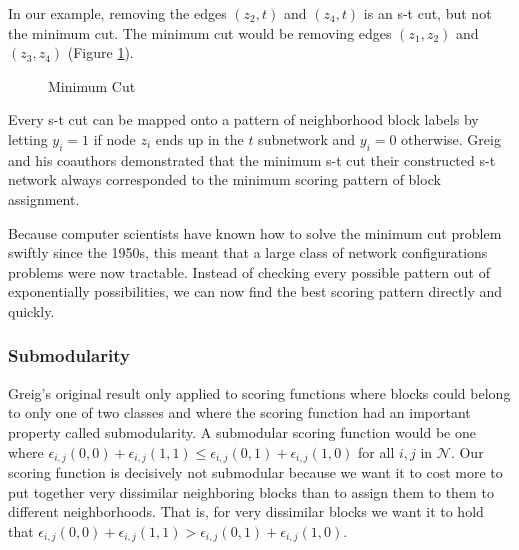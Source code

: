 In our example, removing the edges $(z_2, t)$ and $(z_4, t)$ is an s-t
cut, but not the minimum cut. The minimum cut would be removing edges
$(z_1, z_2)$ and $(z_3, z_4)$ (Figure \ref{fig:mincut}).

\begin{figure}[!h]
\centering

\caption{Minimum Cut}
\label{fig:mincut}
\end{figure}

Every s-t cut can be mapped onto a pattern of neighborhood block
labels by letting $y_i = 1$ if node $z_i$ ends up in the $t$
subnetwork and $y_i = 0$ otherwise. Greig and his coauthors
demonstrated that the minimum s-t cut their constructed s-t network
always corresponded to the minimum scoring pattern of block
assignment.

Because computer scientists have known how to solve the minimum cut
problem swiftly since the 1950s, this meant that a large class of
network configurations problems were now tractable. Instead of
checking every possible pattern out of exponentially possibilities, we
can now find the best scoring pattern directly and
quickly.\cite{ford_maximal_1956}

\subsubsection*{Submodularity}
Greig's original result only applied to scoring functions 
where blocks could belong to only one of two classes and where the
scoring function had an important property called submodularity.  A
submodular scoring function would be one where $\epsilon_{i,j}(0,0) +
\epsilon_{i,j}(1,1) \leq \epsilon_{i,j}(0,1) + \epsilon_{i,j}(1,0)$
for all $i,j$ in $\mathcal{N}$. Our scoring function is decisively not
submodular because we want it to cost more to put together very
dissimilar neighboring blocks than to assign them to them to different
neighborhoods. That is, for very dissimilar blocks we want it to hold
that $\epsilon_{i,j}(0,0) + \epsilon_{i,j}(1,1) \boldsymbol{>}
\epsilon_{i,j}(0,1) + \epsilon_{i,j}(1,0)$.

